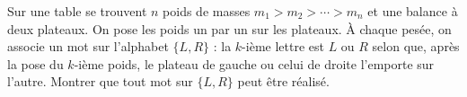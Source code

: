 Sur une table se trouvent $n$ poids de masses $m_1 > m_2 > \cdots > m_n$ et une balance à deux plateaux. On pose les poids un par un sur les plateaux. À chaque pesée, on associe un mot sur l'alphabet $\{L, R\}$ : la $k$-ième lettre est $L$ ou $R$ selon que, après la pose du $k$-ième poids, le plateau de gauche ou celui de droite l'emporte sur l'autre. Montrer que tout mot sur $\{L, R\}$ peut être réalisé.
